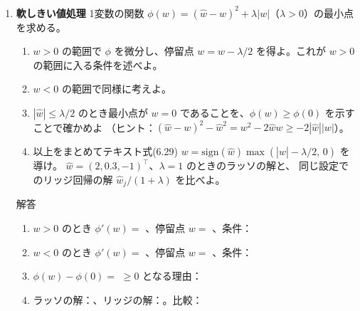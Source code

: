 \documentclass[a4paper,dvipdfmx]{jsarticle}
\newcommand{\提出期限}{2026年11月2日（月）}
\newcommand{\学籍番号}{0000000}
\newcommand{\氏名}{氏名を書く}
\newcommand{\提出日}{2026年11月2日}
\newenvironment{answer}{\begin{itembox}[l]{解答}}{\end{itembox}}
\begin{document}
\begin{enumerate}
  \item \textbf{軟しきい値処理}\quad
    1変数の関数 $\phi(w) = (\hat{w} - w)^2 + \lambda|w|$（$\lambda > 0$）の最小点を求める。
    \begin{enumerate}
      \item $w > 0$ の範囲で $\phi$ を微分し、停留点 $w = \hat{w} - \lambda/2$ を得よ。これが $w > 0$ の範囲に入る条件を述べよ。
      \item $w < 0$ の範囲で同様に考えよ。
      \item $|\hat{w}| \leq \lambda/2$ のとき最小点が $w = 0$ であることを、$\phi(w) \geq \phi(0)$ を示すことで確かめよ
        （ヒント：$(\hat{w} - w)^2 - \hat{w}^2 = w^2 - 2\hat{w}w \geq -2|\hat{w}||w|$）。
      \item 以上をまとめてテキスト式(6.29) $w = \mathrm{sign}(\hat{w})\max(|\hat{w}| - \lambda/2,\, 0)$ を導け。
        $\hat{w} = (2, 0.3, -1)^\top$、$\lambda = 1$ のときのラッソの解と、
        同じ設定でのリッジ回帰の解 $\hat{w}_j/(1 + \lambda)$ を比べよ。
    \end{enumerate}
    \begin{answer}
      \begin{enumerate}
        \item $w > 0$ のとき $\phi'(w) = $ \phantom{XXXXXXXXXX}、停留点 $w = $ \phantom{XXXXXX}、条件：\phantom{XXXXXX}
          \vspace{4mm}
        \item $w < 0$ のとき $\phi'(w) = $ \phantom{XXXXXXXXXX}、停留点 $w = $ \phantom{XXXXXX}、条件：\phantom{XXXXXX}
          \vspace{4mm}
        \item $\phi(w) - \phi(0) = $ \phantom{XXXXXXXXXXXXXXXX} $\geq 0$ となる理由：
          \vspace{12mm}
        \item ラッソの解：\phantom{XXXXXXXXXXXX}、リッジの解：\phantom{XXXXXXXXXXXX}。比較：
          \vspace{10mm}
      \end{enumerate}
    \end{answer}


\end{enumerate}
\end{document}
